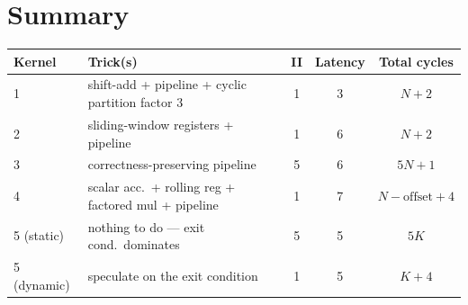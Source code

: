 \documentclass[11pt,a4paper]{article}
\begin{document}
\section*{Summary}

\begin{center}
\begin{tabular}{p{1.5cm} p{6cm} c c c}
\toprule
Kernel & Trick(s) & II & Latency & Total cycles \\
\midrule
1           & shift-add + pipeline + cyclic partition factor 3     & 1 & 3 & $N + 2$ \\
2           & sliding-window registers + pipeline                 & 1 & 6 & $N + 2$ \\
3           & correctness-preserving pipeline                      & 5 & 6 & $5N + 1$ \\
4           & scalar acc.\ + rolling reg + factored mul + pipeline & 1 & 7 & $N - \text{offset} + 4$ \\
5 (static)  & nothing to do --- exit cond.\ dominates              & 5 & 5 & $5K$ \\
5 (dynamic) & speculate on the exit condition                     & 1 & 5 & $K + 4$ \\
\bottomrule
\end{tabular}
\end{center}
\end{document}
